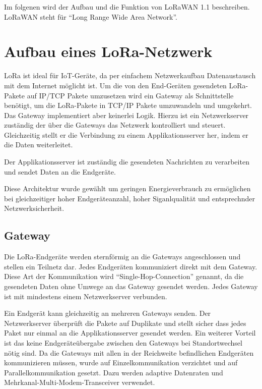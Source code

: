 \documentclass[a4paper, 12pt]{article}
\begin{document}
        Im folgenen wird der Aufbau und die Funktion von LoRaWAN 1.1 beschreiben.\newline
        LoRaWAN steht für ``Long Range Wide Area Network''. \cite{WhatIsLoRa}

        
        
    \section{Aufbau eines LoRa-Netzwerk}
        LoRa ist ideal für IoT-Geräte, da per einfachem Netzwerkaufbau Datenaustausch mit dem Internet möglicht ist.
        Um die von den End-Geräten gesendeten LoRa-Pakete auf IP/TCP Pakete umzusetzen wird ein Gateway als Schnittstelle
        benötigt, um die LoRa-Pakete in TCP/IP Pakete umzuwandeln und umgekehrt.
        Das Gateway implementiert aber keinerlei Logik. Hierzu ist ein Netzwerkserver zuständig der über die 
        Gateways das Netzwerk kontrolliert und steuert. Gleichzeitig stellt er die Verbindung zu einem 
        Applikationsserver her, indem er die Daten weiterleitet.

        Der Applikationsserver ist zuständig die gesendeten Nachrichten zu verarbeiten und sendet Daten an die 
        Endgeräte.

        Diese Architektur wurde gewählt um geringen Energieverbrauch zu ermöglichen bei gleichzeitiger 
        hoher Endgeräteanzahl, hoher Siganlqualität und entsprechnder Netzwerksicherheit. \cite[S. 8 ff.]{WhatIsLoRa}
        
        \subsection{Gateway}
            Die LoRa-Endgeräte werden sternförmig an die Gateways angeschlossen und stellen ein Teilnetz dar. 
            Jedes Endgeräten kommuniziert direkt mit dem Gateway. Diese Art der Kommunikation wird  
            ``Single-Hop-Connection'' genannt, da die gesendeten Daten ohne Umwege an das Gateway gesendet werden. 
            Jedes Gateway ist mit mindestens einem Netzwerkserver verbunden.
        
            Ein Endgerät kann gleichzeitig an mehreren Gateways senden. Der Netzwerkserver überprüft die Pakete 
            auf Duplikate und stellt sicher dass jedes Paket nur einmal an die Applikationsserver gesendet werden.
            Ein weiterer Vorteil ist das keine Endgeräteübergabe zwischen den Gateways bei Standortwechsel nötig sind.
            Da die Gateways mit allen in der Reichweite befindlichen Endgeräten kommunizieren müssen, wurde 
            auf Einzelkommunikation verzichtet und auf Parallelkommunikation gesetzt. 
            Dazu werden adaptive Datenraten und Mehrkanal-Multi-Modem-Transceiver verwendet.
        
\end{document}
